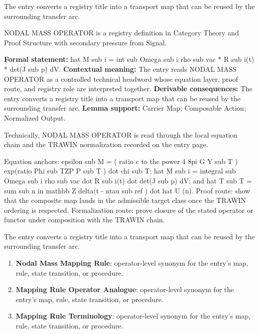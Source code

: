 The entry converts a registry title into a transport map that can be reused by the surrounding transfer arc.
\clearpage


\begingroup\small
{}
NODAL MASS OPERATOR is a registry definition in Category Theory and Proof Structure with secondary pressure from Signal.

\begingroup\footnotesize\setlength{\emergencystretch}{3em}\sloppy
\textbf{Formal statement:} hat M sub i = int sub Omega sub i rho sub vac * R sub i(t) * det(J sub p) dV. \textbf{Contextual meaning:} The entry reads NODAL MASS OPERATOR as a controlled technical headword whose equation layer, proof route, and registry role are interpreted together. \textbf{Derivable consequences:} The entry converts a registry title into a transport map that can be reused by the surrounding transfer arc. \textbf{Lemma support:} Carrier Map; Composable Action; Normalized Output.\par
\endgroup

Technically, NODAL MASS OPERATOR is read through the local equation chain and the TRAWIN normalization recorded on the entry page.

Equation anchors: epsilon sub M = ( ratio c to the power 4 8pi G Y sub T ) exp(ratio Phi sub TZP P sub T ) dot chi sub T; hat M sub i = integral sub Omega sub i rho sub vac dot R sub i(t) dot det(J sub p) dV; and hat T sub T = sum sub n in mathbb Z delta(t - ntau sub ref ) dot hat U (n). Proof route: show that the composite map lands in the admissible target class once the TRAWIN ordering is respected. Formalization route: prove closure of the stated operator or functor under composition with the TRAWIN chain.

The entry converts a registry title into a transport map that can be reused by the surrounding transfer arc.
\endgroup

\begin{enumerate}[leftmargin=1.6em,itemsep=6pt,topsep=4pt]
\item \textbf{Nodal Mass Mapping Rule}: operator-level synonym for the entry's map, rule, state transition, or procedure.
\item \textbf{Mapping Rule Operator Analogue}: operator-level synonym for the entry's map, rule, state transition, or procedure.
\item \textbf{Mapping Rule Terminology}: operator-level synonym for the entry's map, rule, state transition, or procedure.
\end{enumerate}

